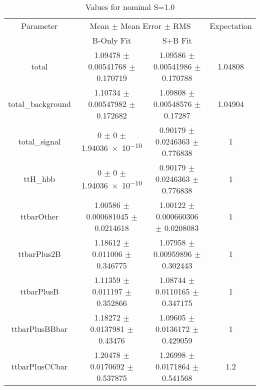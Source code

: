 \begin{table}
\centering
\caption{Values for nominal S=1.0}
\begin{tabular}{cccc}
\toprule
Parameter & \multicolumn{2}{c}{Mean $\pm$ Mean Error $\pm$ RMS} & Expectation\\
 & B-Only Fit & S+B Fit & \\
\midrule
total & \num{1.09478} $\pm$ \num{0.00541768} $\pm$ \num{0.170719} & \num{1.09586} $\pm$ \num{0.00541986} $\pm$ \num{0.170788} & \num{1.04808}\\
total\_background & \num{1.10734} $\pm$ \num{0.00547982} $\pm$ \num{0.172682} & \num{1.09808} $\pm$ \num{0.00548576} $\pm$ \num{0.17287} & \num{1.04904}\\
total\_signal & \num{0} $\pm$ \num{0} $\pm$ \num{1.94036e-10} & \num{0.90179} $\pm$ \num{0.0246363} $\pm$ \num{0.776838} & \num{1}\\
ttH\_hbb & \num{0} $\pm$ \num{0} $\pm$ \num{1.94036e-10} & \num{0.90179} $\pm$ \num{0.0246363} $\pm$ \num{0.776838} & \num{1}\\
ttbarOther & \num{1.00586} $\pm$ \num{0.000681045} $\pm$ \num{0.0214618} & \num{1.00122} $\pm$ \num{0.000660306} $\pm$ \num{0.0208083} & \num{1}\\
ttbarPlus2B & \num{1.18612} $\pm$ \num{0.011006} $\pm$ \num{0.346775} & \num{1.07958} $\pm$ \num{0.00959896} $\pm$ \num{0.302443} & \num{1}\\
ttbarPlusB & \num{1.11359} $\pm$ \num{0.011197} $\pm$ \num{0.352866} & \num{1.08744} $\pm$ \num{0.0110165} $\pm$ \num{0.347175} & \num{1}\\
ttbarPlusBBbar & \num{1.18272} $\pm$ \num{0.0137981} $\pm$ \num{0.43476} & \num{1.09605} $\pm$ \num{0.0136172} $\pm$ \num{0.429059} & \num{1}\\
ttbarPlusCCbar & \num{1.20478} $\pm$ \num{0.0170692} $\pm$ \num{0.537875} & \num{1.26998} $\pm$ \num{0.0171864} $\pm$ \num{0.541568} & \num{1.2}\\
\bottomrule
\end{tabular}
\end{table}